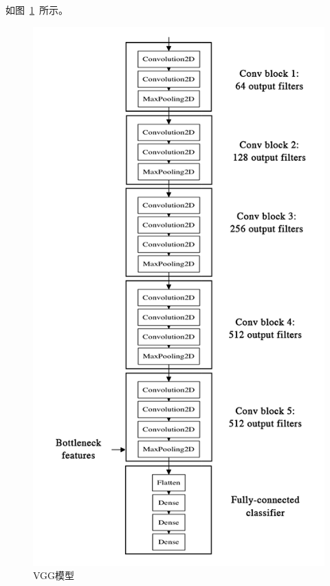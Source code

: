 如图~\ref{VGG模型}~所示。
\begin{figure}[!htbp]
	\centering	\includegraphics[width=12cm]{pic/assets/pretrained}
    \caption{VGG模型}	\label{VGG模型}	\end{figure}


